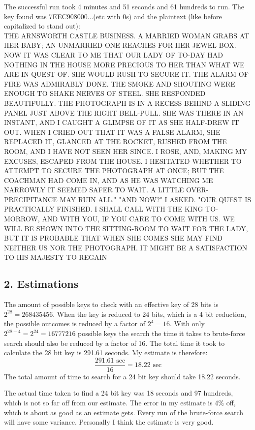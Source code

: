 The successful run took 4 minutes and 51 seconds and 61 hundreds to run.
The key found was 7EEC908000...(etc with 0s) and the plaintext (like before capitalized to stand out): \\
THE ARNSWORTH CASTLE BUSINESS. A MARRIED WOMAN GRABS AT HER BABY;
AN UNMARRIED ONE REACHES FOR HER JEWEL-BOX. NOW IT WAS CLEAR TO
ME THAT OUR LADY OF TO-DAY HAD NOTHING IN THE HOUSE MORE PRECIOUS
TO HER THAN WHAT WE ARE IN QUEST OF. SHE WOULD RUSH TO SECURE IT.
THE ALARM OF FIRE WAS ADMIRABLY DONE. THE SMOKE AND SHOUTING WERE
ENOUGH TO SHAKE NERVES OF STEEL. SHE RESPONDED BEAUTIFULLY. THE
PHOTOGRAPH IS IN A RECESS BEHIND A SLIDING PANEL JUST ABOVE THE
RIGHT BELL-PULL. SHE WAS THERE IN AN INSTANT, AND I CAUGHT A
GLIMPSE OF IT AS SHE HALF-DREW IT OUT. WHEN I CRIED OUT THAT IT
WAS A FALSE ALARM, SHE REPLACED IT, GLANCED AT THE ROCKET, RUSHED
FROM THE ROOM, AND I HAVE NOT SEEN HER SINCE. I ROSE, AND, MAKING
MY EXCUSES, ESCAPED FROM THE HOUSE. I HESITATED WHETHER TO
ATTEMPT TO SECURE THE PHOTOGRAPH AT ONCE; BUT THE COACHMAN HAD
COME IN, AND AS HE WAS WATCHING ME NARROWLY IT SEEMED SAFER TO
WAIT. A LITTLE OVER-PRECIPITANCE MAY RUIN ALL."
"AND NOW?" I ASKED.
"OUR QUEST IS PRACTICALLY FINISHED. I SHALL CALL WITH THE KING
TO-MORROW, AND WITH YOU, IF YOU CARE TO COME WITH US. WE WILL BE
SHOWN INTO THE SITTING-ROOM TO WAIT FOR THE LADY, BUT IT IS
PROBABLE THAT WHEN SHE COMES SHE MAY FIND NEITHER US NOR THE
PHOTOGRAPH. IT MIGHT BE A SATISFACTION TO HIS MAJESTY TO REGAIN

\subsection*{2. Estimations}

The amount of possible keys to check with an effective key of 28 bits is $2^{28} = 268 435 456$.
When the key is reduced to 24 bits, which is a 4 bit reduction, the possible outcomes is reduced by a factor of $2^{4} = 16$.
With only $2^{28-4} = 2^{24} = 16 777 216$ possible keys the search the time it takes to brute-force search should also be reduced by a factor of 16.
The total time it took to calculate the 28 bit key is 291.61 seconds.
My estimate is therefore:
$$ \frac{291.61 \text{ sec}}{16} = 18.22 \text{ sec} $$
The total amount of time to search for a 24 bit key should take 18.22 seconds.

The actual time taken to find a 24 bit key was 18 seconds and 97 hundreds, which is not so far off from our estimate.
The error in my estimate is $4 \%$ off, which is about as good as an estimate gets.
Every run of the brute-force search will have some variance.
Personally I think the estimate is very good.

